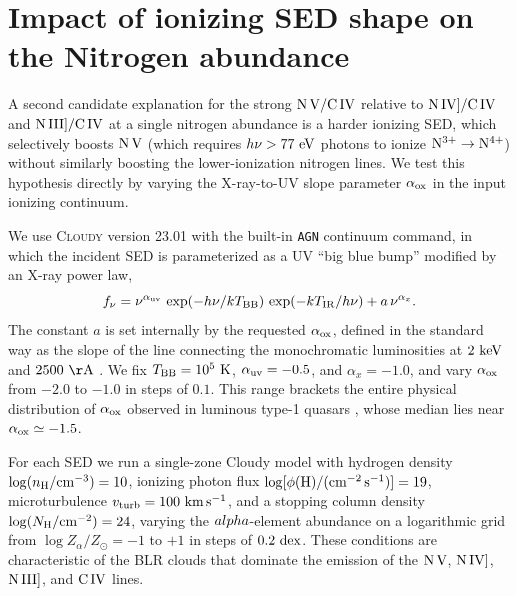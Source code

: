 
\section{Impact of ionizing SED shape on the Nitrogen abundance}
\label{sec:appendix_aox}

A second candidate explanation for the strong $\rm N\,V/C\,IV$ relative to
$\rm N\,IV]/C\,IV$ and $\rm N\,III]/C\,IV$ at a single nitrogen abundance
is a harder ionizing SED, which selectively boosts $\rm N\,V$ (which
requires $h\nu > 77~\rm eV$ photons to ionize $\rm N^{3+}\rightarrow
N^{4+}$) without similarly boosting the lower-ionization nitrogen lines.
We test this hypothesis directly by varying the X-ray-to-UV slope
parameter $\alpha_{\rm ox}$ in the input ionizing continuum.

We use \textsc{Cloudy} version 23.01 \citep{Ferland2017} with the built-in
\texttt{AGN} continuum command, in which the incident SED is parameterized
as a UV ``big blue bump'' modified by an X-ray power law,
\begin{equation}
f_{\nu} = \nu^{\alpha_{\rm uv}}\,
         \exp\!\left(-h\nu/kT_{\rm BB}\right)\,
         \exp\!\left(-kT_{\rm IR}/h\nu\right)
       + a\,\nu^{\alpha_{x}}.
\label{eq:agn_sed}
\end{equation}
The constant $a$ is set internally by the requested $\alpha_{\rm ox}$,
defined in the standard way as the slope of the line connecting the
monochromatic luminosities at $2~\rm keV$ and $2500~\rm \AA$
\citep{Tananbaum1979}.  We fix $T_{\rm BB} = 10^{5}~\rm K$,
$\alpha_{\rm uv} = -0.5$, and $\alpha_{x} = -1.0$, and vary
$\alpha_{\rm ox}$ from $-2.0$ to $-1.0$ in steps of $0.1$.  This range
brackets the entire physical distribution of $\alpha_{\rm ox}$ observed in
luminous type-1 quasars
\citep{Strateva2005, Steffen2006, Just2007, LussoRisaliti2016}, whose
median lies near $\alpha_{\rm ox} \simeq -1.5$.

For each SED we run a single-zone Cloudy model with hydrogen density
$\log(n_{\rm H}/{\rm cm^{-3}}) = 10$, ionizing photon flux
$\log[\phi({\rm H})/(\rm cm^{-2}\,s^{-1})] = 19$, microturbulence
$v_{\rm turb} = 100~\rm km\,s^{-1}$, and a stopping column density
$\log(N_{\rm H}/{\rm cm^{-2}}) = 24$, varying the $\\alpha$-element abundance on
a logarithmic grid from $\log Z_{\alpha}/Z_{\odot} = -1$ to $+1$ in steps of
$0.2~\rm dex$.  These conditions are characteristic of the BLR clouds
that dominate the emission of the $\rm N\,V$, $\rm N\,IV]$, $\rm N\,III]$,
and $\rm C\,IV$ lines.

